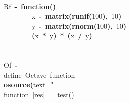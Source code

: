 \documentclass[english,10pt,a4paper]{article}\usepackage{graphicx, color}
\makeatletter
\newcommand{\hlnumber}[1]{\textcolor[rgb]{0,0,0}{#1}}%
\newcommand{\hlfunctioncall}[1]{\textcolor[rgb]{0.501960784313725,0,0.329411764705882}{\textbf{#1}}}%
\newcommand{\hlstring}[1]{\textcolor[rgb]{0.6,0.6,1}{#1}}%
\newcommand{\hlkeyword}[1]{\textcolor[rgb]{0,0,0}{\textbf{#1}}}%
\newcommand{\hlargument}[1]{\textcolor[rgb]{0.690196078431373,0.250980392156863,0.0196078431372549}{#1}}%
\newcommand{\hlcomment}[1]{\textcolor[rgb]{0.180392156862745,0.6,0.341176470588235}{#1}}%
\newcommand{\hlassignement}[1]{\textcolor[rgb]{0,0,0}{\textbf{#1}}}%
\newcommand{\hlsymbol}[1]{\textcolor[rgb]{0,0,0}{#1}}%
\newcommand{\hlstd}[1]{\textcolor[rgb]{0,0,0}{#1}}%
\newenvironment{kframe}{%
 \def\FrameCommand##1{\hskip\@totalleftmargin \hskip-\fboxsep
 \colorbox{shadecolor}{##1}\hskip-\fboxsep
     \hskip-\linewidth \hskip-\@totalleftmargin \hskip\columnwidth}%
 \MakeFramed {\advance\hsize-\width
   \@totalleftmargin\z@ \linewidth\hsize
   \@setminipage}}%
 {\par\unskip\endMakeFramed}
\newenvironment{knitrout}{}{} %
\makeatother
\begin{document}
\begin{knitrout}
\color{fgcolor}\begin{kframe}
\begin{flushleft}
\ttfamily\noindent
\hspace*{\fill}\\
\hlstd{}\hlsymbol{Rf}{\ }\hlassignement{\usebox{\hlnormalsizeboxlessthan}-}{\ }\hlkeyword{function}\hlkeyword{(}\hlkeyword{)}\hlkeyword{\usebox{\hlnormalsizeboxopenbrace}}\hspace*{\fill}\\
\hlstd{}{\ }{\ }{\ }{\ }{\ }{\ }{\ }{\ }\hlsymbol{x}{\ }\hlassignement{\usebox{\hlnormalsizeboxlessthan}-}{\ }\hlfunctioncall{matrix}\hlkeyword{(}\hlfunctioncall{runif}\hlkeyword{(}\hlnumber{100}\hlkeyword{)}\hlkeyword{,}{\ }\hlnumber{10}\hlkeyword{)}\hspace*{\fill}\\
\hlstd{}{\ }{\ }{\ }{\ }{\ }{\ }{\ }{\ }\hlsymbol{y}{\ }\hlassignement{\usebox{\hlnormalsizeboxlessthan}-}{\ }\hlfunctioncall{matrix}\hlkeyword{(}\hlfunctioncall{rnorm}\hlkeyword{(}\hlnumber{100}\hlkeyword{)}\hlkeyword{,}{\ }\hlnumber{10}\hlkeyword{)}\hspace*{\fill}\\
\hlstd{}{\ }{\ }{\ }{\ }{\ }{\ }{\ }{\ }\hlkeyword{(}\hlsymbol{x}{\ }\hlkeyword{*}{\ }\hlsymbol{y}\hlkeyword{)}{\ }\hlkeyword{\usebox{\hlnormalsizeboxpercent}*\usebox{\hlnormalsizeboxpercent}}{\ }\hlkeyword{(}\hlsymbol{x}{\ }\hlkeyword{/}{\ }\hlsymbol{y}\hlkeyword{)}\hspace*{\fill}\\
\hlstd{}\hlkeyword{\usebox{\hlnormalsizeboxclosebrace}}\hspace*{\fill}\\
\hlstd{}\hspace*{\fill}\\
\hlstd{}\hlsymbol{Of}{\ }\hlassignement{\usebox{\hlnormalsizeboxlessthan}-}{\ }\hlkeyword{\usebox{\hlnormalsizeboxopenbrace}}\hspace*{\fill}\\
\hlstd{}\hlcomment{\usebox{\hlnormalsizeboxhash}{\ }define{\ }Octave{\ }function}\hspace*{\fill}\\
\hlstd{}\hlfunctioncall{o\usebox{\hlnormalsizeboxunderscore}source}\hlkeyword{(}\hlargument{text}\hlargument{=}\hlstring{"{}\hspace*{\fill}\\
\hlstd{}function{\ }[res]{\ }={\ }test()\hspace*{\fill}\\
}
\end{flushleft}
\end{kframe}
\end{knitrout}
\end{document}
